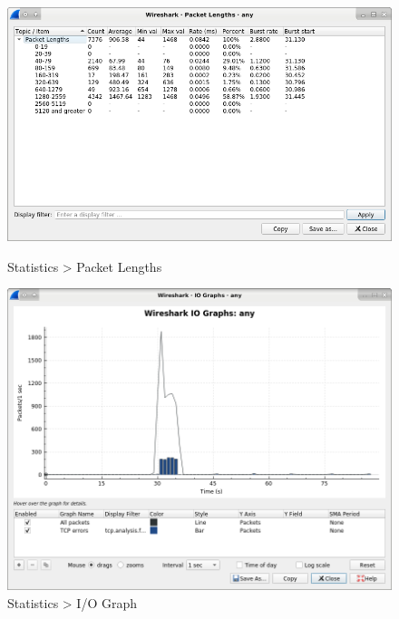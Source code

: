 \begin{figure}[!htp]
    \centering
    \begin{minipage}{.64\textwidth}
        \centering
        \includegraphics[width=.99\textwidth]
        {../_INCLUDES/main/task3/3-4.png}
        \caption{Statistics > Packet Lengths}
        \label{fig:3-4}
    \end{minipage}
    \begin{minipage}{.34\textwidth}
        \centering
        \includegraphics[width=.99\textwidth]
        {../_INCLUDES/main/task3/3-5.png}
        \caption{Statistics > I/O Graph}
        \label{fig:3-5}
    \end{minipage}
\end{figure}

